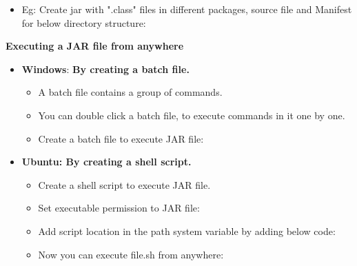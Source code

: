 \begin{flushleft}
\begin{itemize}
		\item Eg: Create jar with ".class" files in different packages, source file and Manifest for below directory structure:
		\bigskip
		
		
	\end{itemize}
	\newpage
	\textbf{Executing a JAR file from anywhere}
	\begin{itemize}
		\item \textbf{Windows}:  \textbf{By creating a batch file.}
		\begin{itemize}
			\item A batch file contains a group of commands. 
			\item You can double click a batch file, to execute commands in it one by one.
			\item Create a batch file to execute JAR file:
			\bigskip
		\end{itemize}
		\item \textbf{Ubuntu: By creating a shell script.}
		\begin{itemize}
			\item Create a shell script to execute JAR file.
			\bigskip
			\item Set executable permission to JAR file:
			\bigskip
			\item Add script location in the path system variable by adding below code:
			\bigskip
			\item Now you can execute file.sh from anywhere:
			\bigskip
		\end{itemize}
			
	\end{itemize}
	
	
\end{flushleft}

\newpage

